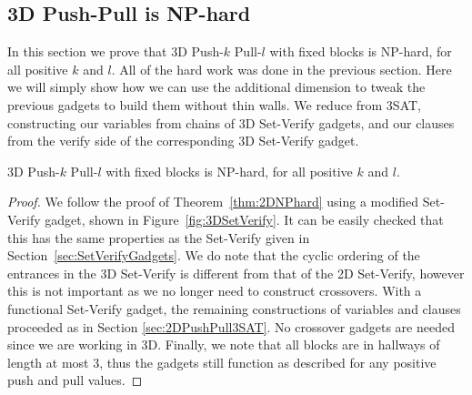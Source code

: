 \subsection{3D Push-Pull is NP-hard}
\label{3DNPhard}
In this section we prove that 3D Push-$k$ Pull-$l$ with fixed blocks is NP-hard, for all positive $k$ and $l$. All of the hard work was done in the previous section. Here we will simply show how we can use the additional dimension to tweak the previous gadgets to build them without thin walls. We reduce from 3SAT, constructing our variables from chains of 3D Set-Verify gadgets, and our clauses from the verify side of the corresponding 3D Set-Verify gadget.

\begin{theorem}
3D Push-$k$ Pull-$l$ with fixed blocks is NP-hard, for all positive $k$ and $l$.
\end{theorem}
\begin{proof}
We follow the proof of Theorem~\ref{thm:2DNPhard} using a modified Set-Verify gadget, shown in Figure~\ref{fig:3DSetVerify}.  It can be easily checked that this has the same properties as the Set-Verify given in Section~\ref{sec:SetVerifyGadgets}. We do note that the cyclic ordering of the entrances in the 3D Set-Verify is different from that of the 2D Set-Verify, however this is not important as we no longer need to construct crossovers. With a functional Set-Verify gadget, the remaining constructions of variables and clauses proceeded as in Section \ref{sec:2DPushPull3SAT}. No crossover gadgets are needed since we are working in 3D. Finally, we note that all blocks are in hallways of length at most 3, thus the gadgets still function as described for any positive push and pull values.


\end{proof}
